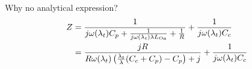 \documentclass[../main.tex]{subfiles}
\begin{document}
\begin{frame}{Why no analytical expression?}
\begin{align*}
\begin{split}
    Z
      &= \frac{1}{j \omega(\lambda_{t}) C_{p} + \frac{1}{j \omega(\lambda_{t}) \lambda L_{\text{On}}} + \frac{1}{R}}
        + \frac{1}{j \omega(\lambda_{t}) C_{c}}\\
      &= \frac{j R }{
          R\omega(\lambda_{t})
          \left(\frac{\lambda_{t}}{\lambda}(C_{c} + C_{p}) - C_{p}\right)
          + j } + \frac{1}{j \omega(\lambda_{t})C_{c}}\\
\end{split}
\end{align*}
\end{frame}

%
%
\end{document}
